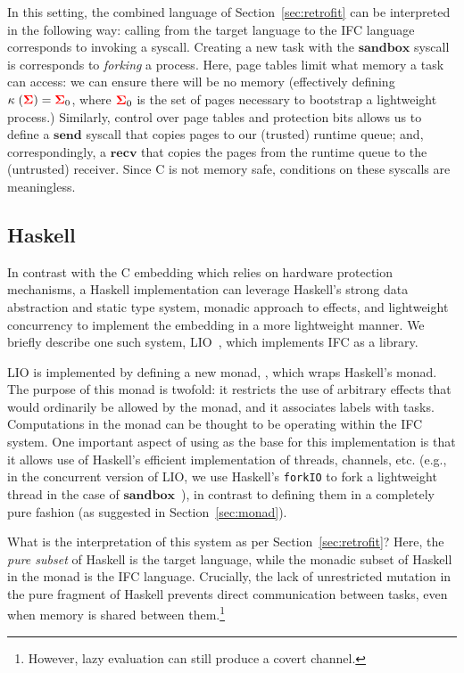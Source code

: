 \documentclass{sigplanconf}
\begin{document}
In this setting, the combined language of Section~\ref{sec:retrofit}
can be interpreted in the following way: calling from the target
language to the IFC language corresponds to invoking a syscall.
%
Creating a new task with the \ensuremath{\mathbf{sandbox}} syscall is corresponds to
\emph{forking} a process.  Here, page tables limit what memory
a task can access: we can ensure there will be no memory (effectively
defining \ensuremath{\kappa\;(\tar{\Sigma})\mathrel{=}\tar{\Sigma}_{0}}, where \ensuremath{\tar{\Sigma}_{0}} is the set of pages necessary to bootstrap a
lightweight process.)
%
Similarly, control over page tables and protection bits allows us to
define a \ensuremath{\mathbf{send}} syscall that copies pages to our
(trusted) runtime queue; and, correspondingly, a \ensuremath{\mathbf{recv}} that copies
the pages from the runtime queue to the (untrusted) receiver.
%
Since C is not memory safe, conditions on these syscalls are
meaningless.


\subsection{Haskell}
\label{sec:real:hs}
In contrast with the C embedding which relies on hardware protection
mechanisms, a Haskell implementation can leverage Haskell's strong data
abstraction and static type system, monadic approach to effects, and
lightweight concurrency to implement the embedding in a more lightweight
manner.  We briefly describe one such system, LIO~\cite{lio}, which
implements IFC as a library.

LIO is implemented by defining a new monad, , which wraps Haskell's 
monad.
%
The purpose of this monad is twofold: it restricts the use of
arbitrary effects that would ordinarily be allowed by the  monad,
and it associates labels with tasks.
%
Computations in the 
monad can be thought to be operating within the IFC system.
%
One important aspect of using  as the base for this
implementation is that it allows use of Haskell's efficient
implementation of threads, channels, etc. (e.g., in the concurrent
version of LIO, we use Haskell's \texttt{forkIO} to fork a lightweight
thread in the case of \ensuremath{\mathbf{sandbox}}~\cite{stefan:addressing-covert}), in
contrast to defining them in a completely pure fashion (as suggested
in Section~\ref{sec:monad}).

What is the interpretation of this system as per Section~\ref{sec:retrofit}?
%
Here, the \emph{pure subset} of Haskell is the target language, while
the monadic subset of Haskell in the  monad is the IFC
language.
%
Crucially, the lack of unrestricted mutation in the pure fragment of
Haskell prevents direct communication between tasks, even when memory is
shared between them.\footnote{However, lazy evaluation can still produce
a covert channel.}
\end{document}
